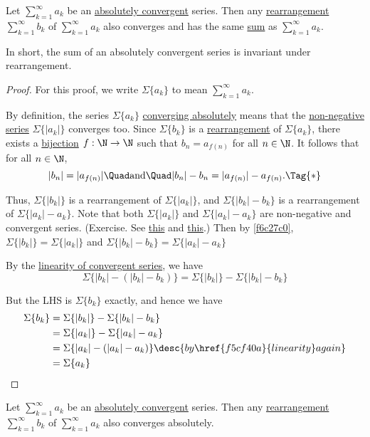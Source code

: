 \label{c171f8a}

Let $\sum_{k=1}^\infty a_k$ be an \href{f823d65}{absolutely convergent} series.
Then any \href{a58ff93}{rearrangement} $\sum_{k=1}^\infty b_k$ of
$\sum_{k=1}^\infty a_k$ also converges and has the same \href{f8901df}{sum} as
$\sum_{k=1}^\infty a_k$.

In short, the sum of an absolutely convergent series is invariant under
rearrangement.

\begin{proof}
  \def\S#1{\Sigma\{#1\}}
  For this proof, we write $\S{a_k}$ to mean $\sum_{k=1}^\infty a_k$.

  By definition, the series $\S{a_k}$ \href{f823d65}{converging absolutely}
  means that the \href{b6cffeb}{non-negative series} $\S{|a_k|}$ converges too.
  Since $\S{b_k}$ is a \href{a58ff93}{rearrangement} of $\S{a_k}$, there exists
  a \href{d205f32}{bijection} $f:\N\to\N$ such that $b_n=a_{f(n)}$ for all
  $n\in\N$. It follows that for all $n\in\N$,
  \begin{equation*}
    |b_n|=|a_{f(n)}|\Quad\text{and}\Quad|b_n|-b_n=|a_{f(n)}|-a_{f(n)}.\Tag{*}
  \end{equation*}

  Thus, $\S{|b_k|}$ is a rearrangement of $\S{|a_k|}$, and $\S{|b_k|-b_k}$ is a
  rearrangement of $\S{|a_k|-a_k}$. Note that both $\S{|a_k|}$ and
  $\S{|a_k|-a_k}$ are non-negative and convergent series. (Exercise. See
  \href{e8bb6e3}{this} and \href{d13a5e7}{this}.) Then by \autoref{f6c27c0},
  $\S{|b_k|}=\S{|a_k|}$ and $\S{|b_k|-b_k}=\S{|a_k|-a_k}$

  By the \href{f5cf40a}{linearity of convergent series}, we have
  $$
    \S{|b_k|-(|b_k|-b_k)}=\S{|b_k|}-\S{|b_k|-b_k}
  $$

  But the LHS is $\S{b_k}$ exactly, and hence we have
  \begin{align*}
    \S{b_k} &=\S{|b_k|}-\S{|b_k|-b_k}                                        \\
            &=\S{|a_k|}-\S{|a_k|-a_k}                                        \\
            &=\S{|a_k|-(|a_k|-a_k)}\desc{by \href{f5cf40a}{linearity} again} \\
            &=\S{a_k}
  \end{align*}
\end{proof}

\label{b9ee095}

Let $\sum_{k=1}^\infty a_k$ be an \href{f823d65}{absolutely convergent} series.
Then any \href{a58ff93}{rearrangement} $\sum_{k=1}^\infty b_k$ of
$\sum_{k=1}^\infty a_k$ also converges absolutely.

